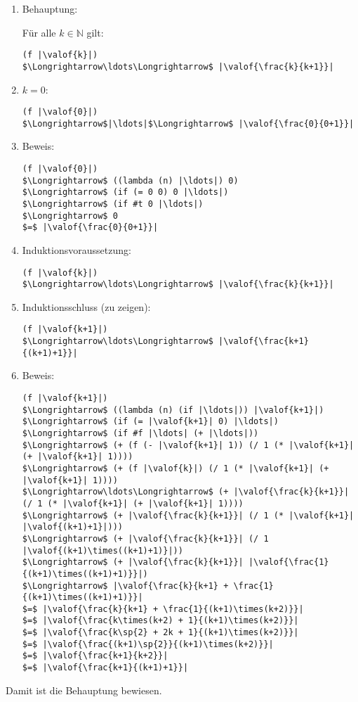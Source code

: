 \begin{enumerate}
\item Behauptung:

  Für alle $k\in\mathbb{N}$ gilt:

\begin{lstlisting}
(f |\valof{k}|)
$\Longrightarrow\ldots\Longrightarrow$ |\valof{\frac{k}{k+1}}|
\end{lstlisting}

\item $k=0$:
%
\begin{lstlisting}
(f |\valof{0}|)
$\Longrightarrow$|\ldots|$\Longrightarrow$ |\valof{\frac{0}{0+1}}|
\end{lstlisting}

\item Beweis:
\begin{lstlisting}
(f |\valof{0}|)
$\Longrightarrow$ ((lambda (n) |\ldots|) 0)
$\Longrightarrow$ (if (= 0 0) 0 |\ldots|)
$\Longrightarrow$ (if #t 0 |\ldots|)
$\Longrightarrow$ 0
$=$ |\valof{\frac{0}{0+1}}|
\end{lstlisting}
%
\item Induktionsvoraussetzung:

\begin{lstlisting}
(f |\valof{k}|)
$\Longrightarrow\ldots\Longrightarrow$ |\valof{\frac{k}{k+1}}|
\end{lstlisting}

\item
Induktionsschluss (zu zeigen):
%
\begin{lstlisting}
(f |\valof{k+1}|)
$\Longrightarrow\ldots\Longrightarrow$ |\valof{\frac{k+1}{(k+1)+1}}|
\end{lstlisting}
%
\item Beweis:
\begin{lstlisting}
(f |\valof{k+1}|)
$\Longrightarrow$ ((lambda (n) (if |\ldots|)) |\valof{k+1}|)
$\Longrightarrow$ (if (= |\valof{k+1}| 0) |\ldots|)
$\Longrightarrow$ (if #f |\ldots| (+ |\ldots|))
$\Longrightarrow$ (+ (f (- |\valof{k+1}| 1)) (/ 1 (* |\valof{k+1}| (+ |\valof{k+1}| 1))))
$\Longrightarrow$ (+ (f |\valof{k}|) (/ 1 (* |\valof{k+1}| (+ |\valof{k+1}| 1))))
$\Longrightarrow\ldots\Longrightarrow$ (+ |\valof{\frac{k}{k+1}}| (/ 1 (* |\valof{k+1}| (+ |\valof{k+1}| 1))))
$\Longrightarrow$ (+ |\valof{\frac{k}{k+1}}| (/ 1 (* |\valof{k+1}| |\valof{(k+1)+1}|)))
$\Longrightarrow$ (+ |\valof{\frac{k}{k+1}}| (/ 1 |\valof{(k+1)\times((k+1)+1)}|))
$\Longrightarrow$ (+ |\valof{\frac{k}{k+1}}| |\valof{\frac{1}{(k+1)\times((k+1)+1)}}|)
$\Longrightarrow$ |\valof{\frac{k}{k+1} + \frac{1}{(k+1)\times((k+1)+1)}}|
$=$ |\valof{\frac{k}{k+1} + \frac{1}{(k+1)\times(k+2)}}|
$=$ |\valof{\frac{k\times(k+2) + 1}{(k+1)\times(k+2)}}|
$=$ |\valof{\frac{k\sp{2} + 2k + 1}{(k+1)\times(k+2)}}|
$=$ |\valof{\frac{(k+1)\sp{2}}{(k+1)\times(k+2)}}|
$=$ |\valof{\frac{k+1}{k+2}}|
$=$ |\valof{\frac{k+1}{(k+1)+1}}|
\end{lstlisting}
%
\end{enumerate}
Damit ist die Behauptung bewiesen.

